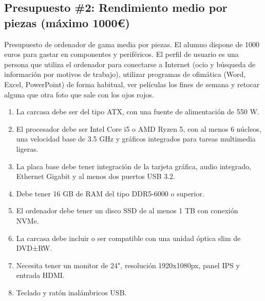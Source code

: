 \documentclass[spanish,openany]{report}
\begin{document}
\subsection*{Presupuesto \#2: Rendimiento medio por piezas (máximo 1000\euro)}
Presupuesto de ordenador de gama media por piezas. El alumno dispone de 1000 euros para gastar en componentes y periféricos. El perfil de usuario es una persona que utiliza el ordenador para conectarse a Internet (ocio y búsqueda de información por motivos de trabajo), utilizar programas de ofimática (Word, Excel, PowerPoint) de forma habitual, ver películas los fines de semana y retocar alguna que otra foto que sale con los ojos rojos.
\begin{enumerate}
\item{La carcasa debe ser del tipo ATX, con una fuente de alimentación de 550 W.}
\item{El procesador debe ser Intel Core i5 o AMD Ryzen 5, con al menos 6 núcleos, una velocidad base de 3.5 GHz y gráficos integrados para tareas multimedia ligeras.}
\item{La placa base debe tener integración de la tarjeta gráfica, audio integrado, Ethernet Gigabit y al menos dos puertos USB 3.2.}
\item{Debe tener 16 GB de RAM del tipo DDR5-6000 o superior.}
\item{El ordenador debe tener un disco SSD de al menos 1 TB con conexión NVMe.}
\item{La carcasa debe incluir o ser compatible con una unidad óptica slim de DVD±RW.}
\item{Necesita tener un monitor de 24", resolución 1920x1080px, panel IPS y entrada HDMI.}
\item{Teclado y ratón inalámbricos USB.}
\end{enumerate}
\end{document}
